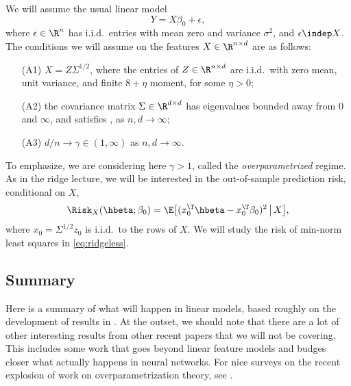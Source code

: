 \documentclass{article}
\begin{document}
We will assume the usual linear model 
\begin{equation}
\label{eq:model}
Y = X\beta_0 + \epsilon,
\end{equation}
where $\epsilon \in \R^n$ has i.i.d.\ entries with mean zero and variance
$\sigma^2$, and $\epsilon \indep X$. The conditions we will assume on the
features $X \in \R^{n \times d}$ are as follows:
\begin{itemize}
\item[(A1)] $X = Z \Sigma^{1/2}$, where the entries of $Z \in \R^{n \times d}$
  are i.i.d.\ with zero mean, unit variance, and finite $8+\eta$ moment, for
  some $\eta>0$; 
\item[(A2)] the covariance matrix $\Sigma \in \R^{d \times d}$ has eigenvalues
  bounded away from $0$ and $\infty$, and satisfies ,
  as $n,d \to \infty$; 
\item[(A3)] $d/n \to \gamma \in (1,\infty)$ as $n,d \to \infty$.
\end{itemize}
To emphasize, we are considering here $\gamma > 1$, called the
\emph{overparametrized} regime. As in the ridge lecture, we will be interested
in the out-of-sample prediction risk, conditional on $X$, 
\begin{equation}
\label{eq:risk}
\Risk_X(\hbeta; \beta_0) = \E \big[ ( x_0^\T \hbeta - x_0^\T \beta_0 )^2
\,\big|\, X \big],
\end{equation}
where $x_0 = \Sigma^{1/2} z_0$ is i.i.d.\ to the rows of $X$. We will study the
risk of min-norm least squares in \eqref{eq:ridgeless}.  

\subsection{Summary}

Here is a summary of what will happen in linear models, based roughly on the
development of results  in \citet{hastie2022surprises}. At the outset, we should
note that there are a lot of other interesting results from other recent papers
that we will not be covering. This includes some work that goes beyond linear
feature models and budges closer what actually happens in neural networks. For
nice surveys on the recent explosion of work on overparametrization theory, see 
\citet{bartlett2021deep, belkin2021fit, dar2021farewell}.      
\end{document}
